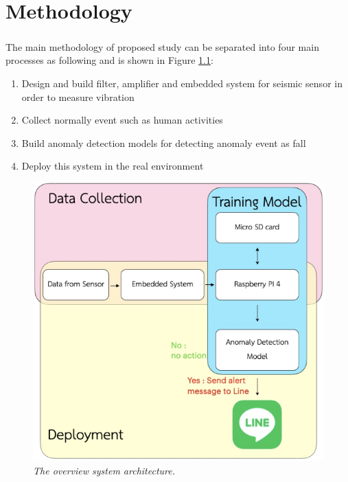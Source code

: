 \setlength{\parindent}{0in} 
\setlength{\parskip}{1em}
\setlength{\baselineskip}{1.6em}

\chapter{Methodology}
\label{ch:methodology}
\paragraph{}
The main methodology of proposed study can be separated into four main processes as following and is shown in Figure \ref{fig:system_overview}:
\begin{enumerate}
\item Design and build filter, amplifier and embedded system for seismic sensor in order to  measure vibration
\item Collect normally event such as human activities
\item Build  anomaly detection models for detecting anomaly event as fall
\item Deploy this system in the real environment
\end{enumerate}

\begin{figure}[H]
  \centering
  \caption[The overview system architecture.]{\emph{The overview system architecture.}}\label{fig:system_overview}
  \includegraphics[scale = 0.4]{figures/system_overview.jpg}  
\end{figure}




